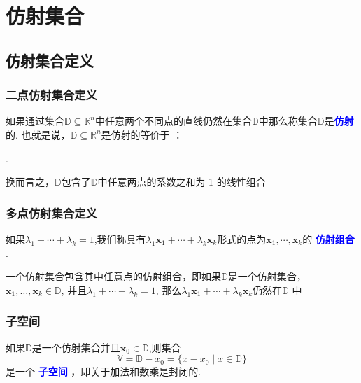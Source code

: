\documentclass{lzureport}
\begin{document}
\section{仿射集合}

\subsection{仿射集合定义}
\subsubsection{二点仿射集合定义}
如果通过集合$\mathbb{D}\subseteq\mathbb{R}^n$中任意两个不同点的直线仍然在集合$\mathbb{D}$中那么称集合$\mathbb{D}$是\textcolor{blue}{\textbf{仿射}}的. 
也就是说，$\mathbb{D}\subseteq\mathbb{R}^n$是仿射的\textcolor{YBXPurple}{等价于} ： 

\begin{center}
	\colorbox{yellow}{}.
\end{center}

换而言之，$\mathbb{D}$包含了$\mathbb{D}$中任意两点的系数之和为 1 的线性组合

\subsubsection{多点仿射集合定义}
如果$\lambda_1+\cdots+\lambda_k=1$,我们称具有$\lambda_1\boldsymbol{x}_1+\cdots+\lambda_k\boldsymbol{x}_k$形式的点为$\boldsymbol x_1,\cdots,\boldsymbol x_k$的 \textcolor{blue}{\textbf{仿射组合}} . 

一个仿射集合包含其中任意点的\textcolor{YBXPurple}{仿射组合}，即如果$\mathbb{D}$是一个仿射集合，
$\boldsymbol{x}_1, \ldots , \boldsymbol{x}_k\in \mathbb{D} $, 
并且$\lambda_1+\cdots+\lambda_k=1$,
那么$\lambda_1\boldsymbol{x}_1+\cdots+\lambda_k\boldsymbol{x}_k$仍然在$\mathbb{D}$ 中


\subsubsection{子空间}
如果$\mathbb{D}$是一个仿射集合并且$\boldsymbol x_0\in\mathbb{D}$,则集合
$$\mathbb{V}=\mathbb{D}-x_0=\{x-x_0\mid x\in\mathbb{D}\}$$
是一个 \textcolor{blue}{\textbf{子空间}} ，即关于\textcolor{YBXPurple}{加法}和\textcolor{YBXPurple}{数乘}是封闭的.
\end{document}
